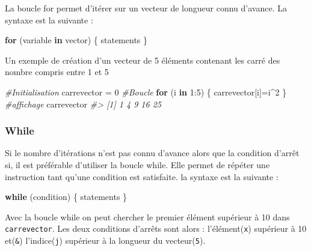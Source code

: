 \documentclass[
]{book}
\newenvironment{Shaded}{\begin{snugshade}}{\end{snugshade}}
\newcommand{\CommentTok}[1]{\textcolor[rgb]{0.56,0.35,0.01}{\textit{#1}}}
\newcommand{\ControlFlowTok}[1]{\textcolor[rgb]{0.13,0.29,0.53}{\textbf{#1}}}
\newcommand{\DecValTok}[1]{\textcolor[rgb]{0.00,0.00,0.81}{#1}}
\newcommand{\NormalTok}[1]{#1}
\newcommand{\OtherTok}[1]{\textcolor[rgb]{0.56,0.35,0.01}{#1}}
\newcommand{\SpecialCharTok}[1]{\textcolor[rgb]{0.00,0.00,0.00}{#1}}
\theoremstyle{definition}
\theoremstyle{definition}
\theoremstyle{definition}
\theoremstyle{definition}
\theoremstyle{remark}
\begin{document}
La boucle for permet d'itérer sur un vecteur de longueur connu d'avance. La syntaxe est la suivante :

\begin{Shaded}
\begin{Highlighting}[]
\ControlFlowTok{for}\NormalTok{ (variable }\ControlFlowTok{in}\NormalTok{ vector) \{}
\NormalTok{  statements}
\NormalTok{\}}
\end{Highlighting}
\end{Shaded}

Un exemple de création d'un vecteur de 5 éléments contenant les carré des nombre compris entre 1 et 5

\begin{Shaded}
\begin{Highlighting}[]
\CommentTok{\#Initialisation}
\NormalTok{carrevector }\OtherTok{=} \DecValTok{0}
\CommentTok{\#Boucle}
\ControlFlowTok{for}\NormalTok{ (i }\ControlFlowTok{in} \DecValTok{1}\SpecialCharTok{:}\DecValTok{5}\NormalTok{) \{}
\NormalTok{  carrevector[i]}\OtherTok{=}\NormalTok{i}\SpecialCharTok{\^{}}\DecValTok{2}
\NormalTok{\}}
\CommentTok{\#affichage}
\NormalTok{carrevector}
\CommentTok{\#\textgreater{} [1]  1  4  9 16 25}
\end{Highlighting}
\end{Shaded}

\hypertarget{while}{%
\subsubsection*{While}\label{while}}

Si le nombre d'itérations n'est pas connu d'avance alors que la condition d'arrêt si, il est préférable d'utiliser la boucle while. Elle permet de répéter une instruction tant qu'une condition est satisfaite. la syntaxe est la suivante :

\begin{Shaded}
\begin{Highlighting}[]
\ControlFlowTok{while}\NormalTok{ (condition) \{}
\NormalTok{  statements}
\NormalTok{\}}
\end{Highlighting}
\end{Shaded}

Avec la boucle while on peut chercher le premier élément supérieur à 10 dans \texttt{carrevector}. Les deux conditions d'arrêts sont alors : l'élément(\texttt{x}) supérieur à 10 et(\texttt{\&}) l'indice(\texttt{j}) supérieur à la longueur du vecteur(\texttt{5}).
\end{document}
